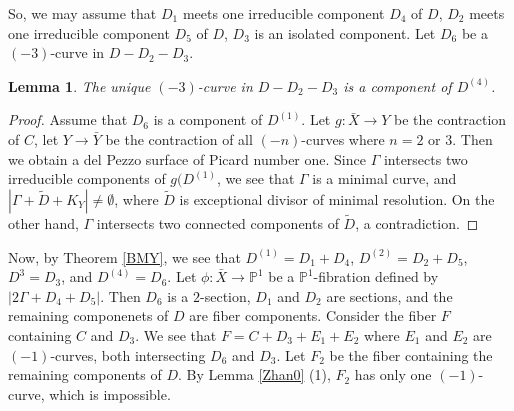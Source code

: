 \documentclass[10pt,oneside,reqno]{amsart}
\newcommand{\pp}{\mathbb{P}}
\newtheorem{lemma}[theorem]{Lemma}
\theoremstyle{definition}
\theoremstyle{remark}
\numberwithin{equation}{section}
\begin{document}
So, we may assume that $D_1$ meets one irreducible component $D_4$ of $D$, $D_2$ meets one irreducible component $D_5$ of $D$, $D_3$ is an isolated component. Let $D_6$ be a $(-3)$-curve in $D-D_2-D_3$.

\begin{lemma}
\label{Case233-10}
The unique $(-3)$-curve in $D-D_2-D_3$ is a component of $D^{(4)}$.
\end{lemma}

\begin{proof}
Assume that $D_6$ is a component of $D^{(1)}$. Let $g\colon\bar{X}\rightarrow Y$ be the contraction of $C$, let $Y\rightarrow\bar{Y}$ be the contraction of all $(-n)$-curves where $n=2$ or $3$. Then we obtain a del Pezzo surface of Picard number one. Since $\Gamma$ intersects two irreducible components of $g(D^{(1)}$, we see that $\Gamma$ is a minimal curve, and  $|\Gamma+\tilde{D}+K_Y|\neq\emptyset$, where $\tilde{D}$ is exceptional divisor of minimal resolution. On the other hand, $\Gamma$ intersects two connected components of $\tilde{D}$, a contradiction.
\end{proof}

Now, by Theorem \ref{BMY}, we see that $D^(1) = D_1+D_4$, $D^(2) = D_2+D_5$, $D^{3} = D_3$, and $D^(4) = D_6$. Let $\phi\colon\bar{X}\rightarrow\pp^1$ be a $\pp^1$-fibration defined by $|2\Gamma + D_4+D_5|$. Then $D_6$ is a $2$-section, $D_1$ and $D_2$ are sections, and the remaining componenets of $D$ are fiber components. Consider the fiber $F$ containing $C$ and $D_3$. We see that $F = C+D_3+E_1+E_2$ where $E_1$ and $E_2$ are $(-1)$-curves, both intersecting $D_6$ and $D_3$. Let $F_2$ be the fiber containing the remaining components of $D$. By Lemma \ref{Zhan0} (1), $F_2$ has only one $(-1)$-curve, which is impossible.
\end{document}

